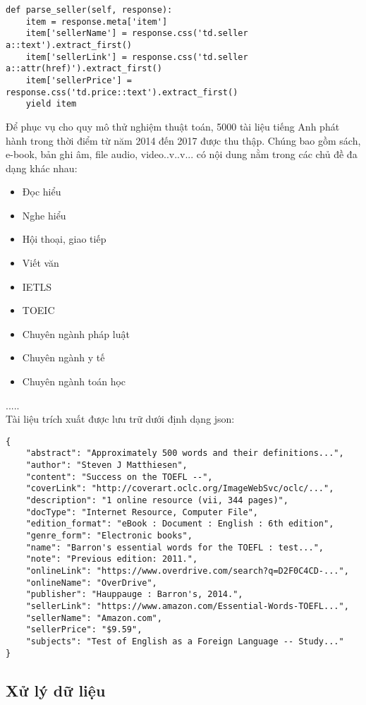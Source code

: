 \begin{lstlisting}[frame = single, style=pythoncode, breaklines=true]
  def parse_seller(self, response):
	item = response.meta['item']
	item['sellerName'] = response.css('td.seller a::text').extract_first()
	item['sellerLink'] = response.css('td.seller a::attr(href)').extract_first()
	item['sellerPrice'] = response.css('td.price::text').extract_first()		
	yield item
\end{lstlisting}
\vskip 0.1in

Để phục vụ cho quy mô thử nghiệm thuật toán, 5000 tài liệu tiếng Anh phát hành trong thời điểm từ năm 2014 đến 2017 được thu thập. Chúng bao gồm sách, e-book, bản ghi âm, file audio, video..v..v... có nội dung nằm trong các chủ đề đa dạng khác nhau:

\begin{itemize}
	\item Đọc hiểu
	\item Nghe hiểu
	\item Hội thoại, giao tiếp
	\item Viết văn
	\item IETLS
	\item TOEIC
	\item Chuyên ngành pháp luật
	\item Chuyên ngành y tế
	\item Chuyên ngành toán học
\end{itemize}

.....\\
Tài liệu trích xuất được lưu trữ dưới định dạng json:

\begin{lstlisting}[style=pythoncode,breaklines=true]
{
	"abstract": "Approximately 500 words and their definitions...", 
	"author": "Steven J Matthiesen", 
	"content": "Success on the TOEFL --", 
	"coverLink": "http://coverart.oclc.org/ImageWebSvc/oclc/...", 
	"description": "1 online resource (vii, 344 pages)", 
	"docType": "Internet Resource, Computer File", 
	"edition_format": "eBook : Document : English : 6th edition", 
	"genre_form": "Electronic books", 
	"name": "Barron's essential words for the TOEFL : test...", 
	"note": "Previous edition: 2011.", 
	"onlineLink": "https://www.overdrive.com/search?q=D2F0C4CD-...", 
	"onlineName": "OverDrive", 
	"publisher": "Hauppauge : Barron's, 2014.", 
	"sellerLink": "https://www.amazon.com/Essential-Words-TOEFL...", 
	"sellerName": "Amazon.com", 
	"sellerPrice": "$9.59", 
	"subjects": "Test of English as a Foreign Language -- Study..."
}
\end{lstlisting}

\subsection{Xử lý dữ liệu}

